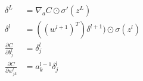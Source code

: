 \documentclass[12pt]{article}
\begin{document}
\Large
\begin{align}
    \delta^L &= \nabla_a C \odot \sigma'(z^L) \\
    \delta^l &= ((w^{l+1})^T)\delta^{l+1})\odot\sigma(z^l) \\
    \frac{\partial C}{\partial b^l_j} &= \delta^l_j \\
    \frac{\partial C}{\partial w^l_{jk}} &= a^{l-1}_k\delta^l_j
\end{align}
\end{document}

